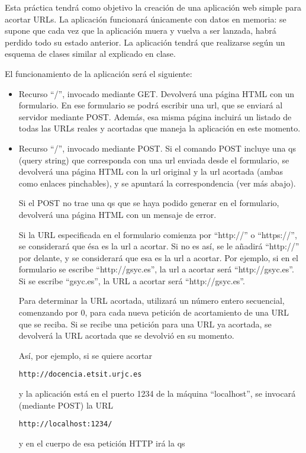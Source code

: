 Esta práctica tendrá como objetivo la creación de una aplicación web simple para acortar URLs. La aplicación funcionará únicamente con datos en memoria: se supone que cada vez que la aplicación muera y vuelva a ser lanzada, habrá perdido todo su estado anterior. La aplicación tendrá que realizarse según un esquema de clases similar al explicado en clase.

El funcionamiento de la aplicación será el siguiente:

\begin{itemize}
\item Recurso ``/'', invocado mediante GET. Devolverá una página HTML con un formulario. En ese formulario se podrá escribir una url, que se enviará al servidor mediante POST. Además, esa misma página incluirá un listado de todas las URLs reales y acortadas que maneja la aplicación en este momento.

\item Recurso ``/'', invocado mediante POST. Si el comando POST incluye una qs (query string) que corresponda con una url enviada desde el formulario, se devolverá una página HTML con la url original y la url acortada (ambas como enlaces pinchables), y se apuntará la correspondencia (ver más abajo).

Si el POST no trae una qs que se haya podido generar en el formulario, devolverá una página HTML con un mensaje de error.

Si la URL especificada en el formulario comienza por ``http://'' o ``https://'', se considerará que ésa es la url a acortar. Si no es así, se le añadirá ``http://'' por delante, y se considerará que esa es la url a acortar. Por ejemplo, si en el formulario se escribe ``http://gsyc.es'', la url a acortar será ``http://gsyc.es''. Si se escribe ``gsyc.es'', la URL a acortar será ``http://gsyc.es''.

Para determinar la URL acortada, utilizará un número entero secuencial, comenzando por 0, para cada nueva petición de acortamiento de una URL que se reciba. Si se recibe una petición para una URL ya acortada, se devolverá la URL acortada que se devolvió en su momento.

Así, por ejemplo, si se quiere acortar

\verb|http://docencia.etsit.urjc.es|

y la aplicación está en el puerto 1234 de la máquina ``localhost'', se invocará (mediante POST) la URL

\verb|http://localhost:1234/|

y en el cuerpo de esa petición HTTP irá la qs


\end{itemize}
